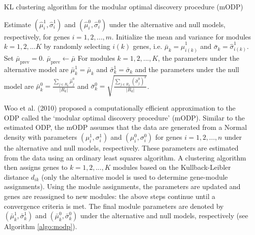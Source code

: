 \documentclass[11pt]{article}
\begin{document}
\begin{algorithm}[!t] 
 \caption{KL clustering algorithm for the modular optimal discovery procedure (mODP)
  \label{algo:modp}
 }
  Estimate $(\hat{\mu}^{1}_{i}, \hat{\sigma}^{1}_{i})$ and $(\hat{\mu}^{0}_{i}, \hat{\sigma}^{0}_{i})$ under the alternative and null models, respectively, for genes $i = 1,2,...,m$. \;
  Initialize the mean and variance for modules $k=1,2,...K$ by randomly selecting $i(k)$ genes, i.e. $\bar{\mu}_{k} = \hat{\mu}^{1}_{i(k)}$ and $\bar{\sigma}_{k} = \hat{\sigma}^{1}_{i(k)}$. Set $\bar{\mu}_{\text{prev}} = 0$. \;
   {
   $\bar{\mu}_{\text{prev}} \gets \bar{\mu}$ \;
  }
  For modules $k=1,2,...,K$, the parameters under the alternative model are $\bar{\mu}^{1}_{k}= \bar{\mu}_{k}$ and $\bar{\sigma}^{1}_{k}=\bar{\sigma}_{k}$ and the parameters under the null model are $\bar{\mu}_{k}^{0} = \frac{\sum_{j\in R_{k}} \hat{\mu}^{0}_{j}}{|R_{k}|}$ and $\bar{\sigma}_{k}^{0} =\sqrt{\frac{\sum_{j\in R_{k}} (\hat{\sigma}^{0}_{j})^{2} }{|R_{k}|}}$. \;
\end{algorithm}

Woo et al. (2010) proposed a computationally efficient approximation to the ODP called the `modular optimal discovery procedure' (mODP). Similar to the estimated ODP, the mODP assumes that the data are generated from a Normal density with parameters $(\mu^{1}_{i}, \sigma^{1}_{i})$ and $(\mu^{0}_{i}, \sigma^{0}_{i})$ for genes $i=1,2,...,n$ under the alternative and null models, respectively. These parameters are estimated from the data using an ordinary least squares algorithm. A clustering algorithm then assigns genes to $k = 1,2, ..., K$ modules based on the Kullback-Leibler distance $d_{ik}$ (only the alternative model is used to determine gene-module assignments). Using the module assignments, the parameters are updated and genes are reassigned to new modules: the above steps continue until a convergence criteria is met. The final module parameters are denoted by $(\bar{\mu}_{k}^{1}, \bar{\sigma}_{k}^{1})$ and $(\bar{\mu}_{k}^{0}, \bar{\sigma}_{k}^{0})$ under the alternative and null models, respectively (see Algorithm \ref{algo:modp}). 
\end{document}
